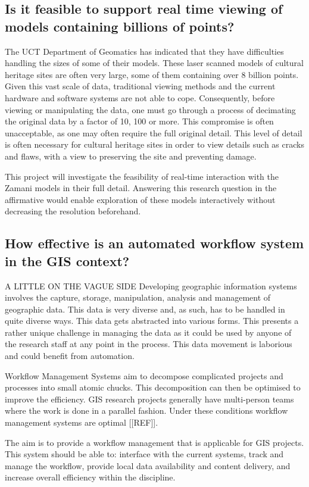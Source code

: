 \documentclass[12pt,a4paper]{article}
\begin{document}
\subsection{Is it feasible to support real time viewing of models containing billions of points?}
The UCT Department of Geomatics has indicated that they have difficulties
handling the sizes of some of their models. These laser scanned models of
cultural heritage sites are often very large, some of them containing over
8 billion points. Given this vast scale of data, traditional viewing methods
and the current hardware and software systems are not able to cope.
Consequently, before viewing or manipulating the data, one must go through
a process of decimating the original data by a factor of 10, 100 or more.
This compromise is often unacceptable, as one may often require the full
original detail. This level of detail is often necessary for cultural heritage
sites in order to view details such as cracks and flaws, with a view to
preserving the site and preventing damage.

This project will investigate the feasibility of real-time interaction with the Zamani models in their full detail. Answering this research question in the affirmative would enable exploration of these models interactively without decreasing the resolution beforehand.
\subsection{How effective is an automated workflow system in the GIS context?}
A LITTLE ON THE VAGUE SIDE
Developing geographic information systems involves the capture, storage, manipulation, analysis
and management of geographic data. This data is very diverse and, as such, has to be handled
in quite diverse ways. This data gets abstracted into various forms. This presents a
rather unique challenge in managing the data as it could be used by anyone of the research
staff at any point in the process. This data movement is laborious and could benefit
from automation.

Workflow Management Systems aim to decompose complicated projects and processes into
small atomic chucks. This decomposition can then be optimised to improve the efficiency.
GIS research projects generally have multi-person teams where the work is
done in a parallel fashion. Under these conditions workflow management systems
are optimal [[REF]].

The aim is to provide a workflow management that is applicable for GIS projects.
This system should be able to: interface with the current systems, track and
manage the workflow, provide local data availability and content delivery, and
increase overall efficiency within the discipline.
\end{document}
